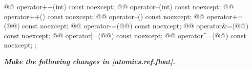 \begin{codeblock}
{{    @@ operator++(int) const noexcept;
    @@ operator--(int) const noexcept;
    @@ operator++() const noexcept;
    @@ operator--() const noexcept;
    @@ operator+=(@@) const noexcept;
    @@ operator-=(@@) const noexcept;
    @@ operator&=(@@) const noexcept;
    @@ operator|=(@@) const noexcept;
    @@ operator^=(@@) const noexcept;
  };
}
\end{codeblock}

\textbf{\textit{Make the following changes in [atomics.ref.float].}} \\

